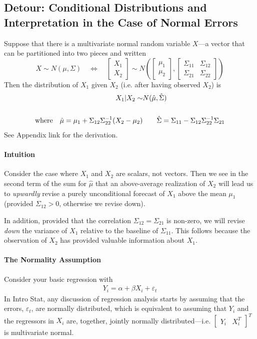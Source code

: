 \documentclass[a4paper,12pt]{article}
\begin{document}
\clearpage
\subsection{Detour: Conditional Distributions and Interpretation in the Case of Normal Errors}

Suppose that there is a multivariate normal random variable $X$---a vector that can be partitioned into two pieces and written
\[
  X \sim N(\mu, \Sigma) \quad\Leftrightarrow\quad
  \begin{bmatrix} X_1 \\ X_2 \end{bmatrix}
  \sim 
  N\left(\begin{bmatrix} \mu_1 \\ \mu_2 \end{bmatrix},
  \begin{bmatrix} \Sigma_{11} & \Sigma_{12} \\
  \Sigma_{21} & \Sigma_{22} \end{bmatrix} 
  \right)
\]
Then the distribution of $X_1$ given $X_2$ (i.e. after having observed $X_2$) is 
\begin{align}
  X_1 | X_2 \sim &N(\hat{\mu}, \hat{\Sigma})  \notag\\
  \label{reg} \\
  \text{where} \quad
  \hat{\mu} = \mu_1 + \Sigma_{12} \Sigma^{-1}_{22} 
  (X_2-\mu_2)  & \quad \quad
  \hat{\Sigma} = \Sigma_{11} - \Sigma_{12} \Sigma^{-1}_{22} 
    \Sigma_{21}
  \notag
\end{align}
See Appendix {link} for the derivation.

\paragraph{Intuition}
Consider the case where $X_1$ and $X_2$ are scalars, not vectors. Then we see in the second term of the sum for $\hat{\mu}$ that an above-average realization of $X_2$ will lead us to \emph{upwardly} revise a purely unconditional forecast of $X_1$ above the mean $\mu_1$ (provided $\Sigma_{12}>0$, otherwise we revise down). 

In addition, provided that the correlation $\Sigma_{12} = \Sigma_{21}$ is non-zero, we will revise \emph{down} the variance of $X_1$ relative to the baseline of $\Sigma_{11}$. This follows because the observation of $X_2$ has provided valuable information about $X_1$. 


\paragraph{The Normality Assumption} 
Consider your basic regression with 
\begin{align}
  \label{regex}
  Y_i = \alpha + \beta X_i + \varepsilon_t
\end{align}
In Intro Stat, any discussion of regression analysis starts by assuming that the errors, $\varepsilon_t$, are normally distributed, which is equivalent to assuming that $Y_i$ and the regressors in $X_i$ are, together, jointly normally distributed---i.e.  $\begin{bmatrix} Y_i & X^T_i \end{bmatrix}^T$ is  multivariate normal. 
\end{document}
